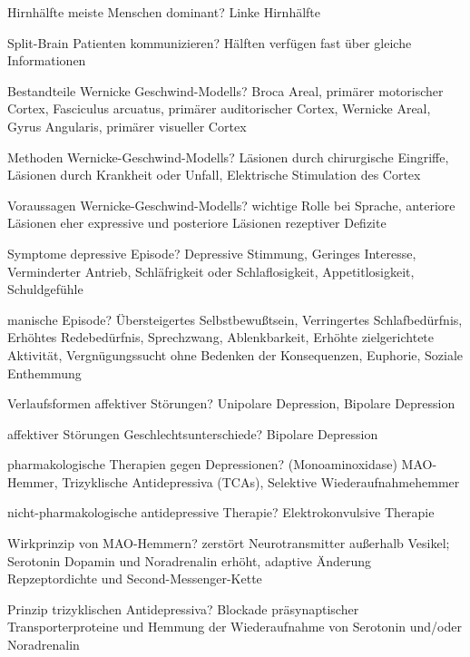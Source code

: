\documentclass[a4paper]{article}
\begin{document}
\begin{multicols}{3}
  Hirnhälfte meiste Menschen dominant? Linke Hirnhälfte

  Split-Brain Patienten kommunizieren? Hälften verfügen fast über gleiche Informationen

  Bestandteile Wernicke Geschwind-Modells? Broca Areal, primärer motorischer Cortex, Fasciculus arcuatus, primärer auditorischer Cortex, Wernicke Areal, Gyrus Angularis, primärer visueller Cortex

  Methoden Wernicke-Geschwind-Modells? Läsionen durch chirurgische Eingriffe, Läsionen durch Krankheit oder Unfall, Elektrische Stimulation des Cortex

  Voraussagen Wernicke-Geschwind-Modells? wichtige Rolle bei Sprache, anteriore Läsionen eher expressive und posteriore Läsionen rezeptiver Defizite

  Symptome depressive Episode? Depressive Stimmung, Geringes Interesse,  Verminderter Antrieb, Schläfrigkeit oder Schlaflosigkeit, Appetitlosigkeit, Schuldgefühle

  manische Episode? Übersteigertes Selbstbewußtsein, Verringertes Schlafbedürfnis, Erhöhtes Redebedürfnis, Sprechzwang, Ablenkbarkeit, Erhöhte zielgerichtete Aktivität, Vergnügungssucht ohne Bedenken der Konsequenzen, Euphorie, Soziale Enthemmung

  Verlaufsformen affektiver Störungen? Unipolare Depression, Bipolare Depression

  affektiver Störungen Geschlechtsunterschiede? Bipolare Depression

  pharmakologische Therapien gegen Depressionen? (Monoaminoxidase) MAO-Hemmer, Trizyklische Antidepressiva (TCAs), Selektive Wiederaufnahmehemmer

  nicht-pharmakologische antidepressive Therapie? Elektrokonvulsive Therapie

  Wirkprinzip von MAO-Hemmern? zerstört Neurotransmitter außerhalb Vesikel; Serotonin Dopamin und Noradrenalin erhöht, adaptive Änderung Repzeptordichte und Second-Messenger-Kette

  Prinzip trizyklischen Antidepressiva? Blockade präsynaptischer Transporterproteine und Hemmung der Wiederaufnahme von Serotonin und/oder Noradrenalin


\end{multicols}
\end{document}
